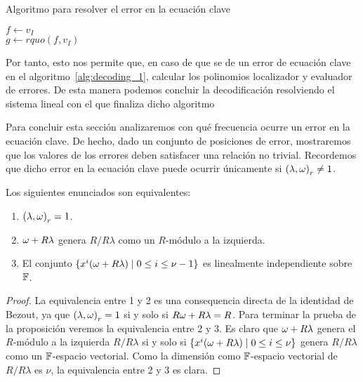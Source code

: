\begin{algorithm}[h!]
 \label{alg:failure_solver}
 \caption{Algoritmo para resolver el error en la ecuación clave}
 \(f \gets v_I\)\\
\(g \gets rquo(f, v_I)\)\\
\end{algorithm}

Por tanto, esto nos permite que, en caso de que se de un error de ecuación clave en el algoritmo~\ref{alg:decoding_1}, calcular los polinomios localizador y evaluador de errores. De esta manera podemos concluir la decodificación resolviendo el sistema lineal con el que finaliza dicho algoritmo

Para concluir esta sección analizaremos con qué frecuencia ocurre un error en la ecuación clave. De hecho, dado un conjunto de posiciones de error, mostraremos que los valores de los errores deben satisfacer una relación no trivial. Recordemos que dicho error en la ecuación clave puede ocurrir únicamente si \({(\lambda, \omega)}_r \neq 1\).

\begin{proposition}
    Los siguientes enunciados son equivalentes:
    \begin{enumerate}
        \item \({(\lambda, \omega)}_r = 1\).
        \item \(\omega + R\lambda\) genera  \(R / R\lambda\) como un \(R\)-módulo a la izquierda.
        \item El conjunto \( \{x^{i}(\omega + R\lambda)  \mid 0 \le i \le \nu -1\}\) es linealmente independiente sobre \(\mathbb{F}\).
    \end{enumerate}
\end{proposition}
\begin{proof}
    La equivalencia entre 1 y 2 es una consequencia directa de la identidad de Bezout, ya que \({(\lambda, \omega)}_r = 1\) si y solo si \(R\omega + R\lambda = R\). Para terminar la prueba de la proposición veremos la equivalencia entre 2 y 3. Es claro que \(\omega + R\lambda\) genera el \(R\)-módulo a la izquierda \(R / R\lambda\) si y solo si  \( \{x^{i}(\omega + R\lambda)  \mid 0 \le i \le \nu\} \) genera \(R / R\lambda\) como un  \(\mathbb{F}\)-espacio vectorial. Como la dimensión como \(\mathbb{F}\)-espacio vectorial de \(R / R\lambda\) es \(\nu\), la equivalencia entre 2 y 3 es clara.
\end{proof}

